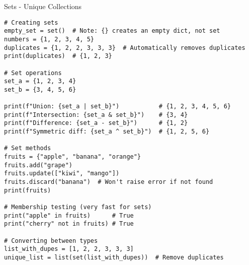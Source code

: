 \begin{frame}[fragile]{Sets - Unique Collections}
    \begin{codeblock}
        \begin{lstlisting}
# Creating sets
empty_set = set()  # Note: {} creates an empty dict, not set
numbers = {1, 2, 3, 4, 5}
duplicates = {1, 2, 2, 3, 3, 3}  # Automatically removes duplicates
print(duplicates)  # {1, 2, 3}

# Set operations
set_a = {1, 2, 3, 4}
set_b = {3, 4, 5, 6}

print(f"Union: {set_a | set_b}")           # {1, 2, 3, 4, 5, 6}
print(f"Intersection: {set_a & set_b}")    # {3, 4}
print(f"Difference: {set_a - set_b}")      # {1, 2}
print(f"Symmetric diff: {set_a ^ set_b}")  # {1, 2, 5, 6}

# Set methods
fruits = {"apple", "banana", "orange"}
fruits.add("grape")
fruits.update(["kiwi", "mango"])
fruits.discard("banana")  # Won't raise error if not found
print(fruits)

# Membership testing (very fast for sets)
print("apple" in fruits)      # True
print("cherry" not in fruits) # True

# Converting between types
list_with_dupes = [1, 2, 2, 3, 3, 3]
unique_list = list(set(list_with_dupes))  # Remove duplicates
        \end{lstlisting}
    \end{codeblock}
\end{frame}

